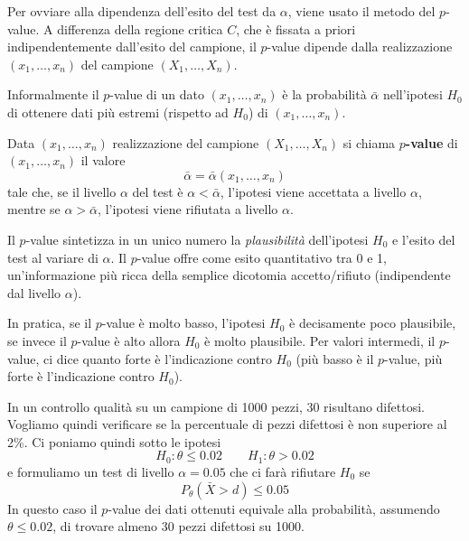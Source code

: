Per ovviare alla dipendenza dell'esito del test da $\alpha$, viene usato il metodo del $p$-value.
A differenza della regione critica $C$, che è fissata a priori indipendentemente dall'esito del
campione, il $p$-value dipende dalla realizzazione $(x_1, \dots, x_n)$ del campione
$(X_1, \dots, X_n)$.

Informalmente il $p$-value di un dato $(x_1, \dots, x_n)$ è la probabilità $\bar{\alpha}$
nell'ipotesi $H_0$ di ottenere dati più estremi (rispetto ad $H_0$) di $(x_1, \dots, x_n)$.

\begin{definition}
	Data $(x_1, \dots, x_n)$ realizzazione del campione $(X_1, \dots, X_n)$ si chiama
	\textbf{$p$-value} di $(x_1, \dots, x_n)$ il valore
	\[ \bar{\alpha} = \bar{\alpha} (x_1, \dots, x_n) \]
	tale che, se il livello $\alpha$ del test è $\alpha < \bar{\alpha}$, l'ipotesi viene accettata
	a livello $\alpha$, mentre se $\alpha > \bar{\alpha}$, l'ipotesi viene rifiutata a livello
	$\alpha$.
\end{definition}

Il $p$-value sintetizza in un unico numero la \emph{plausibilità} dell'ipotesi $H_0$ e l'esito del
test al variare di $\alpha$. Il $p$-value offre come esito quantitativo tra 0 e 1, un'informazione
più ricca della semplice dicotomia accetto/rifiuto (indipendente dal livello $\alpha$).

In pratica, se il $p$-value è molto basso, l'ipotesi $H_0$ è decisamente poco plausibile, se invece
il $p$-value è alto allora $H_0$ è molto plausibile. Per valori intermedi, il $p$-value, ci dice
quanto forte è l'indicazione contro $H_0$ (più basso è il $p$-value, più forte è l'indicazione
contro $H_0$).

\begin{example}
	In un controllo qualità su un campione di 1000 pezzi, 30 risultano difettosi. Vogliamo quindi
	verificare se la percentuale di pezzi difettosi è non superiore al 2\%. Ci poniamo quindi sotto
	le ipotesi
	\[ H_0 : \theta \leq 0.02 \qquad H_1 : \theta > 0.02 \]
	e formuliamo un test di livello $\alpha = 0.05$ che ci farà rifiutare $H_0$ se
	\[ P_\theta (\bar{X} > d) \leq 0.05 \]
	In questo caso il $p$-value dei dati ottenuti equivale alla probabilità, assumendo
	$\theta \leq 0.02$, di trovare almeno 30 pezzi difettosi su 1000.
\end{example}